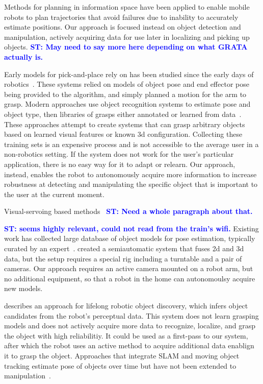 \documentclass[conference]{IEEEtran}
\newcommand{\stnote}[1]{\textcolor{Blue}{\textbf{ST: #1}}}
\begin{document}
Methods for planning in information space \citep{he08, atanasov13,
  prentice09} have been applied to enable mobile robots to plan
trajectories that avoid failures due to inability to accurately
estimate positions.  Our approach is focused instead on
object detection and manipulation, actively acquiring data for use
later in localizing and picking up objects. \stnote{May need to say
  more here depending on what GRATA actually is.}


Early models for pick-and-place rely on has been studied since the
early days of robotics~\citep{brooks83, lozano89}.  These systems
relied on models of object pose and end effector pose being provided to the
algorithm, and simply planned a motion for the arm to grasp.  Modern
approaches use object recognition systems to estimate pose and object
type, then libraries of grasps either annotated or learned from
data~\citep{saxena08, goldfeder09, morales03}.  These approaches
attempt to create systems that can grasp arbitrary objects based on
learned visual features or known 3d configuration.  Collecting these
training sets is an expensive process and is not accessible to the
average user in a non-robotics setting.  If the system does not work
for the user's particular application, there is no easy way for it to
adapt or relearn.  Our approach, instead, enables the robot to
autonomously acquire more information to increase robustness at
detecting and manipulating the specific object that is important to
the user at the current moment.

Visual-servoing based methods~\citep{chaumette06} \stnote{Need a whole
  paragraph about that. }

\stnote{\citet{ciocarlie14} seems highly relevant, could not read from
  the train's wifi.}  Existing work has collected large database of
object models for pose estimation, typically curated by an
expert~\citep{lai11}.  \citet{kasper12} created a semiautomatic system
that fuses 2d and 3d data, but the setup requires a special rig
including a turntable and a pair of cameras.  Our approach requires an
active camera mounted on a robot arm, but no additional equipment, so
that a robot in the home can autonomoulsy acquire new models.

\citet{collect14} describes an approach for lifelong robotic object
discovery, which infers object candidates from the robot's perceptual
data.  This system does not learn grasping models and does not
actively acquire more data to recognize, localize, and grasp the
object with high reliabilitiy.  It could be used as a first-pass to
our system, after which the robot uses an active method to acquire
additional data enablign it to grasp the object.  Approaches that
integrate SLAM and moving object tracking estimate pose of objects
over time but have not been extended to manipulation~\citep{wang07,
  gallagher09}.
\end{document}
